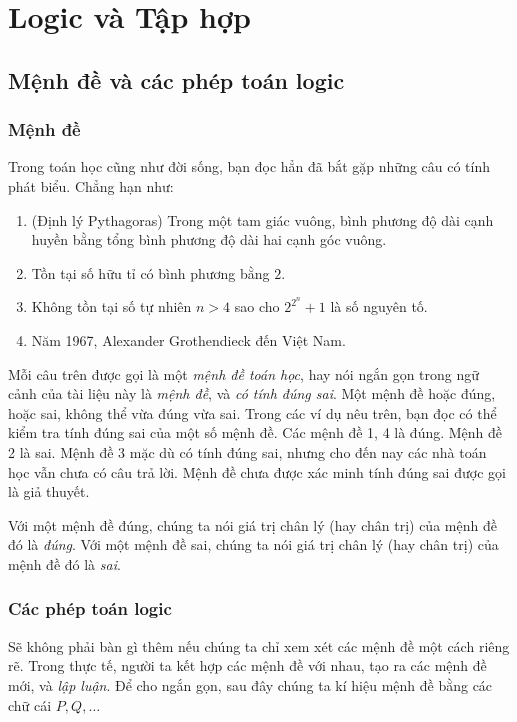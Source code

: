 \chapter{Logic và Tập hợp}\label{chapter:logic-and-set-theory}

\section{Mệnh đề và các phép toán logic}

\subsection{Mệnh đề}

Trong toán học cũng như đời sống, bạn đọc hẳn đã bắt gặp những câu có tính phát biểu. Chẳng hạn như:

\begin{enumerate}[label={(\arabic*)}]
    \item (Định lý Pythagoras) Trong một tam giác vuông, bình phương độ dài cạnh huyền bằng tổng bình phương độ dài hai cạnh góc vuông.
    \item Tồn tại số hữu tỉ có bình phương bằng $2$.
    \item Không tồn tại số tự nhiên $n > 4$ sao cho $2^{2^{n}} + 1$ là số nguyên tố.
    \item Năm 1967, Alexander Grothendieck đến Việt Nam.
\end{enumerate}

Mỗi câu trên được gọi là một \textit{mệnh đề toán học}, hay nói ngắn gọn trong ngữ cảnh của tài liệu này là \textit{mệnh đề}, và \textit{có tính đúng sai}. Một mệnh đề hoặc đúng, hoặc sai, không thể vừa đúng vừa sai. Trong các ví dụ nêu trên, bạn đọc có thể kiểm tra tính đúng sai của một số mệnh đề. Các mệnh đề 1, 4 là đúng. Mệnh đề 2 là sai. Mệnh đề 3 mặc dù có tính đúng sai, nhưng cho đến nay các nhà toán học vẫn chưa có câu trả lời. Mệnh đề chưa được xác minh tính đúng sai được gọi là giả thuyết.

Với một mệnh đề đúng, chúng ta nói giá trị chân lý (hay chân trị) của mệnh đề đó là \textit{đúng}. Với một mệnh đề sai, chúng ta nói giá trị chân lý (hay chân trị) của mệnh đề đó là \textit{sai}.

\subsection{Các phép toán logic}

Sẽ không phải bàn gì thêm nếu chúng ta chỉ xem xét các mệnh đề một cách riêng rẽ. Trong thực tế, người ta kết hợp các mệnh đề với nhau, tạo ra các mệnh đề mới, và \textit{lập luận}. Để cho ngắn gọn, sau đây chúng ta kí hiệu mệnh đề bằng các chữ cái $P, Q,\ldots$

